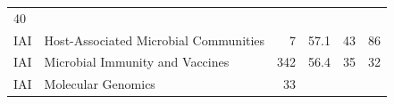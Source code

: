 \documentclass[11pt,]{article}
\begin{document}
\begin{longtable}[]{@{}llrrrr@{}}
\begin{minipage}[t]{0.11\columnwidth}
40\strut
\end{minipage}\tabularnewline
\begin{minipage}[t]{0.06\columnwidth}\raggedright\strut
IAI\strut
\end{minipage} & \begin{minipage}[t]{0.43\columnwidth}\raggedright\strut
Host-Associated Microbial Communities\strut
\end{minipage} & \begin{minipage}[t]{0.04\columnwidth}\raggedleft\strut
7\strut
\end{minipage} & \begin{minipage}[t]{0.08\columnwidth}\raggedleft\strut
57.1\strut
\end{minipage} & \begin{minipage}[t]{0.11\columnwidth}\raggedleft\strut
43\strut
\end{minipage} & \begin{minipage}[t]{0.11\columnwidth}\raggedleft\strut
86\strut
\end{minipage}\tabularnewline
\begin{minipage}[t]{0.06\columnwidth}\raggedright\strut
IAI\strut
\end{minipage} & \begin{minipage}[t]{0.43\columnwidth}\raggedright\strut
Microbial Immunity and Vaccines\strut
\end{minipage} & \begin{minipage}[t]{0.04\columnwidth}\raggedleft\strut
342\strut
\end{minipage} & \begin{minipage}[t]{0.08\columnwidth}\raggedleft\strut
56.4\strut
\end{minipage} & \begin{minipage}[t]{0.11\columnwidth}\raggedleft\strut
35\strut
\end{minipage} & \begin{minipage}[t]{0.11\columnwidth}\raggedleft\strut
32\strut
\end{minipage}\tabularnewline
\begin{minipage}[t]{0.06\columnwidth}\raggedright\strut
IAI\strut
\end{minipage} & \begin{minipage}[t]{0.43\columnwidth}\raggedright\strut
Molecular Genomics\strut
\end{minipage} & \begin{minipage}[t]{0.04\columnwidth}\raggedleft\strut
33\strut
\end{minipage} & \begin{minipage}[t]{0.08\columnwidth}\raggedleft\strut

\end{minipage}
\end{longtable}
\end{document}
